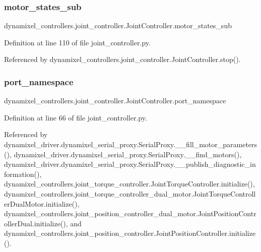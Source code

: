 \subsubsection{\texorpdfstring{motor\+\_\+states\+\_\+sub}{motor\_states\_sub}}
{\footnotesize\ttfamily dynamixel\+\_\+controllers.\+joint\+\_\+controller.\+Joint\+Controller.\+motor\+\_\+states\+\_\+sub\hspace{0.3cm}{\ttfamily [inherited]}}



Definition at line 110 of file joint\+\_\+controller.\+py.



Referenced by dynamixel\+\_\+controllers.\+joint\+\_\+controller.\+Joint\+Controller.\+stop().

\mbox{\label{classdynamixel__controllers_1_1joint__controller_1_1_joint_controller_ac89de71afa48761fb662ac2917a5b9d3}} 
\subsubsection{\texorpdfstring{port\+\_\+namespace}{port\_namespace}}
{\footnotesize\ttfamily dynamixel\+\_\+controllers.\+joint\+\_\+controller.\+Joint\+Controller.\+port\+\_\+namespace\hspace{0.3cm}{\ttfamily [inherited]}}



Definition at line 66 of file joint\+\_\+controller.\+py.



Referenced by dynamixel\+\_\+driver.\+dynamixel\+\_\+serial\+\_\+proxy.\+Serial\+Proxy.\+\_\+\+\_\+fill\+\_\+motor\+\_\+parameters(), dynamixel\+\_\+driver.\+dynamixel\+\_\+serial\+\_\+proxy.\+Serial\+Proxy.\+\_\+\+\_\+find\+\_\+motors(), dynamixel\+\_\+driver.\+dynamixel\+\_\+serial\+\_\+proxy.\+Serial\+Proxy.\+\_\+\+\_\+publish\+\_\+diagnostic\+\_\+information(), dynamixel\+\_\+controllers.\+joint\+\_\+torque\+\_\+controller.\+Joint\+Torque\+Controller.\+initialize(), dynamixel\+\_\+controllers.\+joint\+\_\+torque\+\_\+controller\+\_\+dual\+\_\+motor.\+Joint\+Torque\+Controller\+Dual\+Motor.\+initialize(), dynamixel\+\_\+controllers.\+joint\+\_\+position\+\_\+controller\+\_\+dual\+\_\+motor.\+Joint\+Position\+Controller\+Dual.\+initialize(), and dynamixel\+\_\+controllers.\+joint\+\_\+position\+\_\+controller.\+Joint\+Position\+Controller.\+initialize().

